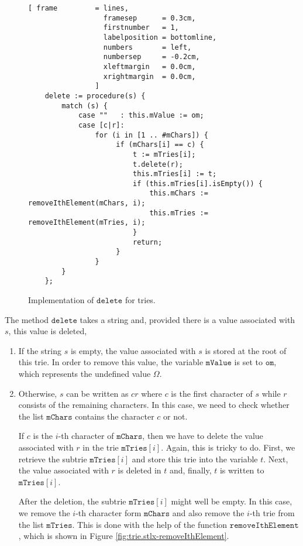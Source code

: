 \begin{figure}[!ht]
\centering
\begin{Verbatim}[ frame         = lines, 
                  framesep      = 0.3cm, 
                  firstnumber   = 1,
                  labelposition = bottomline,
                  numbers       = left,
                  numbersep     = -0.2cm,
                  xleftmargin   = 0.0cm,
                  xrightmargin  = 0.0cm,
                ]
    delete := procedure(s) {
        match (s) {
            case ""   : this.mValue := om;
            case [c|r]: 
                for (i in [1 .. #mChars]) {
                     if (mChars[i] == c) {
                         t := mTries[i]; 
                         t.delete(r);
                         this.mTries[i] := t;
                         if (this.mTries[i].isEmpty()) {
                             this.mChars := removeIthElement(mChars, i);
                             this.mTries := removeIthElement(mTries, i);
                         }
                         return;
                     }
                }
        }
    };
\end{Verbatim}
\vspace*{-0.3cm}
\caption{Implementation of $\mathtt{delete}$ for tries.}
\label{fig:trie.stlx-delete}
\end{figure}

The method $\mathtt{delete}$ takes a string and, provided there is a value associated with $s$, this
value is deleted,
\begin{enumerate}
\item If the string $s$ is empty, the value associated with $s$ is stored at the root of this trie.
      In order to remove this value, the variable $\mathtt{mValue}$ is set to $\mathtt{om}$, which represents
      the undefined value $\Omega$.
\item Otherwise, $s$ can be written as $cr$ where $c$ is the first character of $s$ while $r$
      consists of the remaining characters.  In this case, we need to check whether the list
      $\mathtt{mChars}$ contains the character $c$ or not.
 
      If $c$ is the $i$-th character of $\mathtt{mChars}$, then we have to delete the value 
      associated with $r$ in the trie $\mathtt{mTries}[i]$.  Again, this is tricky to do.
      First, we retrieve the subtrie $\mathtt{mTries}[i]$ and store this trie into the
      variable $t$.  Next, the value associated with $r$ is deleted in $t$ and, finally, 
      $t$ is written to $\mathtt{mTries}[i]$.  

      After the deletion, the subtrie  $\mathtt{mTries}[i]$ might well be empty.  In this case,
      we remove the $i$-th character form $\mathtt{mChars}$ and also remove the $i$-th trie from the list
      $\mathtt{mTries}$.  This is done with the help of the function $\mathtt{removeIthElement}$,
      which is shown in Figure \ref{fig:trie.stlx-removeIthElement}.
\end{enumerate}

